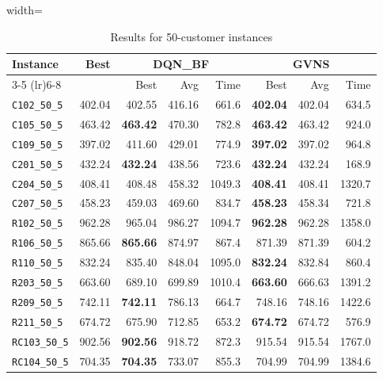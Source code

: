 \begin{table}[ht]
\centering
\small
\setlength{\tabcolsep}{5pt}
\caption{Results for 50-customer instances}
\vspace{4mm}
\begin{adjustbox}{width=\textwidth}
\begin{tabular}{l r r r r @{\hspace{8pt}} r r r @{\hspace{8pt}}}
\toprule
\multirow{2}{*}{Instance} & \multirow{2}{*}{Best} & \multicolumn{3}{c}{DQN\_BF} & \multicolumn{3}{c}{GVNS} \\
\cmidrule(lr){3-5} \cmidrule(lr){6-8}
 &  & Best & Avg & Time & Best & Avg & Time \\
\midrule
\texttt{C102\_50\_5} & 402.04 & 402.55 & 416.16 & 661.6 & \textbf{402.04} & 402.04 & 634.5 \\
\texttt{C105\_50\_5} & 463.42 & \textbf{463.42} & 470.30 & 782.8 & \textbf{463.42} & 463.42 & 924.0 \\
\texttt{C109\_50\_5} & 397.02 & 411.60 & 429.01 & 774.9 & \textbf{397.02} & 397.02 & 964.8 \\
\texttt{C201\_50\_5} & 432.24 & \textbf{432.24} & 438.56 & 723.6 & \textbf{432.24} & 432.24 & 168.9 \\
\texttt{C204\_50\_5} & 408.41 & 408.48 & 458.32 & 1049.3 & \textbf{408.41} & 408.41 & 1320.7 \\
\texttt{C207\_50\_5} & 458.23 & 459.03 & 469.60 & 834.7 & \textbf{458.23} & 458.34 & 721.8 \\
\texttt{R102\_50\_5} & 962.28 & 965.04 & 986.27 & 1094.7 & \textbf{962.28} & 962.28 & 1358.0 \\
\texttt{R106\_50\_5} & 865.66 & \textbf{865.66} & 874.97 & 867.4 & 871.39 & 871.39 & 604.2 \\
\texttt{R110\_50\_5} & 832.24 & 835.40 & 848.04 & 1095.0 & \textbf{832.24} & 832.84 & 860.4 \\
\texttt{R203\_50\_5} & 663.60 & 689.10 & 699.89 & 1010.4 & \textbf{663.60} & 666.63 & 1391.2 \\
\texttt{R209\_50\_5} & 742.11 & \textbf{742.11} & 786.13 & 664.7 & 748.16 & 748.16 & 1422.6 \\
\texttt{R211\_50\_5} & 674.72 & 675.90 & 712.85 & 653.2 & \textbf{674.72} & 674.72 & 576.9 \\
\texttt{RC103\_50\_5} & 902.56 & \textbf{902.56} & 918.72 & 872.3 & 915.54 & 915.54 & 1767.0 \\
\texttt{RC104\_50\_5} & 704.35 & \textbf{704.35} & 733.07 & 855.3 & 704.99 & 704.99 & 1384.6 \\

\end{tabular}
\end{adjustbox}
\end{table}
